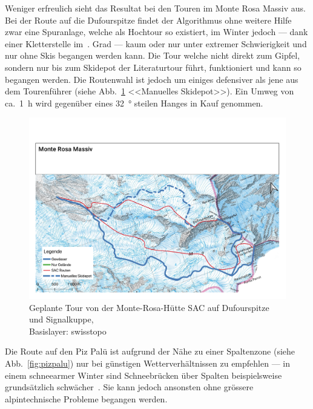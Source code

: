 
Weniger erfreulich sieht das Resultat bei den Touren im Monte Rosa Massiv aus. Bei der Route auf die Dufourspitze findet der Algorithmus ohne weitere Hilfe zwar eine Spuranlage, welche als Hochtour so existiert, im Winter jedoch --- dank einer Kletterstelle im~. Grad --- kaum oder nur unter extremer Schwierigkeit und nur ohne Skis begangen werden kann. 
Die Tour welche nicht direkt zum Gipfel, sondern nur bis zum Skidepot der Literaturtour führt, funktioniert und kann so begangen werden. Die Routenwahl ist jedoch um einiges defensiver als jene aus dem Tourenführer (siehe Abb.\ \ref{fig:monterosa} <<Manuelles Skidepot>>). Ein Umweg von ca.\ \qty{1}{h} wird gegenüber eines \qty{32}{°} steilen Hanges in Kauf genommen.

\begin{figure}[h]
  \centering
  \includegraphics[page=1,width=.9\linewidth]{./../evaluation/PDFs/Monte Rosa Massiv.pdf}
  \caption{Geplante Tour von der Monte-Rosa-Hütte SAC auf Dufourspitze und Signalkuppe,\\Basislayer: swisstopo}\label{fig:monterosa}
\end{figure}

Die Route auf den Piz Palü ist aufgrund der Nähe zu einer Spaltenzone (siehe Abb.\ \ref{fig:pizpalu}) nur bei günstigen Wetterverhältnissen zu empfehlen --- in einem schneearmer Winter sind Schneebrücken über Spalten beispielsweise grundsätzlich schwächer~\cite{bergsteigenErhhtesRisiko}. Sie kann jedoch ansonsten ohne grössere alpintechnische Probleme begangen werden.

